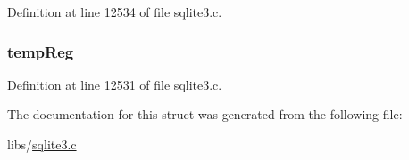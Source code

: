 Definition at line 12534 of file sqlite3.\+c.

\hypertarget{struct_parse_1_1y_col_cache_a47d171a466d6c6109db804959dc78d0d}{}
\subsubsection[{temp\+Reg}]{ temp\+Reg}\label{struct_parse_1_1y_col_cache_a47d171a466d6c6109db804959dc78d0d}


Definition at line 12531 of file sqlite3.\+c.



The documentation for this struct was generated from the following file\+:\begin{DoxyCompactItemize}
\item 
libs/\hyperlink{sqlite3_8c}{sqlite3.\+c}\end{DoxyCompactItemize}
